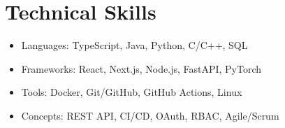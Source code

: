 \documentclass[letterpaper,11pt]{article}
\newcommand{\resumeItem}[1]{
  \item\small{{#1 \vspace{-2pt}}}
}
\newcommand{\resumeSubHeadingListStart}{\begin{itemize}[leftmargin=0.15in, label={}]}
\newcommand{\resumeSubHeadingListEnd}{\end{itemize}}
\begin{document}
\vspace{-8pt}
\section{Technical Skills}
 \resumeSubHeadingListStart
    \resumeItem{Languages: TypeScript, Java, Python, C/C++, SQL}
    \resumeItem{Frameworks: React, Next.js, Node.js, FastAPI, PyTorch}
    \resumeItem{Tools: Docker, Git/GitHub, GitHub Actions, Linux}
    \resumeItem{Concepts: REST API, CI/CD, OAuth, RBAC, Agile/Scrum}
 \resumeSubHeadingListEnd
\end{document}
